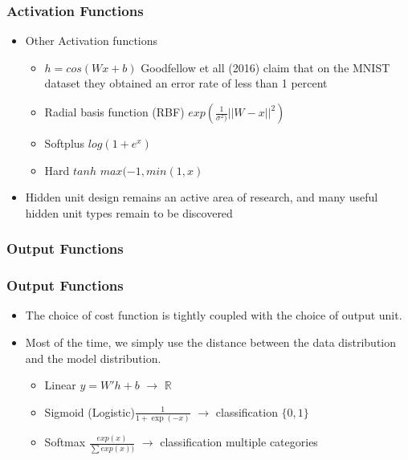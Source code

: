\documentclass[
  shownotes,
  xcolor={svgnames},
  hyperref={colorlinks,citecolor=DarkBlue,linkcolor=DarkRed,urlcolor=DarkBlue}
  , aspectratio=169]{beamer}
\begin{document}
\begin{frame}
\frametitle{Activation Functions}


\begin{itemize}
\item Other Activation functions
\medskip
\begin{itemize}
\item $h=cos(W x+b)$ Goodfellow et all (2016) claim that on the MNIST dataset they obtained an error rate of less than 1 percent
\medskip
\item Radial basis function (RBF) $exp\left( \frac{1}{\sigma^2)}||W-x||^2 \right)$
\medskip
\item Softplus $log(1+e^x)$
\medskip
\item Hard $tanh$ $max(-1,min(1,x)$
\medskip
\end{itemize}
\item Hidden unit design remains an active area of research, and many useful hidden unit types remain to be discovered
\end{itemize}


\end{frame}
\subsubsection{Output Functions}
\begin{frame}
\frametitle{Output Functions}

\begin{itemize}
\item The choice of cost function is tightly coupled with the choice of output unit. 
\medskip
\item Most of the time, we simply use the distance between the data distribution and the model distribution. 
\medskip
\begin{itemize}

    \item Linear $y=W'h +b$ $\rightarrow$  $\mathbb{R}$
    \medskip
    \item Sigmoid (Logistic)$\frac{1}{1 + \exp(-x)}$ $\rightarrow$ classification $\{0,1\}$
    \medskip
    \item Softmax $\frac{exp(x)}{\sum exp(x))}$ $\rightarrow$ classification multiple categories
\end{itemize}
\end{itemize}

\end{frame}
\end{document}
